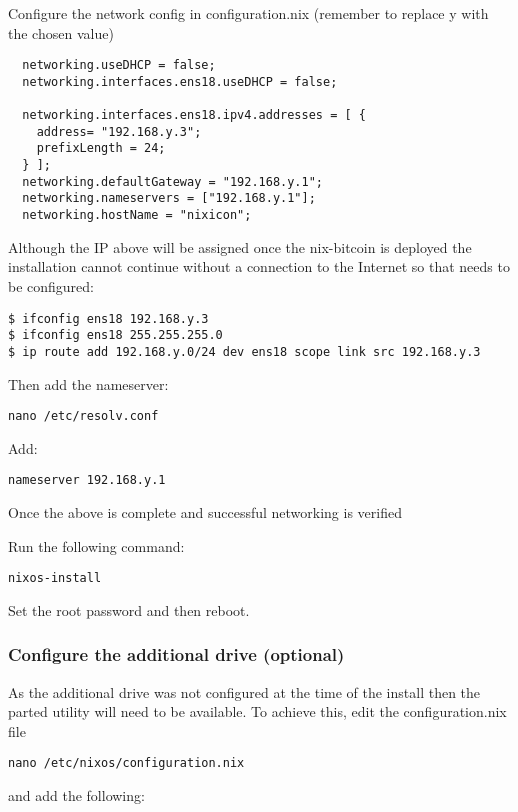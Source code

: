 Configure the network config in configuration.nix (remember to replace y
with the chosen value)

\begin{verbatim}
  networking.useDHCP = false;
  networking.interfaces.ens18.useDHCP = false;

  networking.interfaces.ens18.ipv4.addresses = [ {
    address= "192.168.y.3";
    prefixLength = 24;
  } ];
  networking.defaultGateway = "192.168.y.1";
  networking.nameservers = ["192.168.y.1"];
  networking.hostName = "nixicon";
\end{verbatim}

Although the IP above will be assigned once the nix-bitcoin is deployed
the installation cannot continue without a connection to the Internet so
that needs to be configured:

\begin{verbatim}
$ ifconfig ens18 192.168.y.3
$ ifconfig ens18 255.255.255.0
$ ip route add 192.168.y.0/24 dev ens18 scope link src 192.168.y.3
\end{verbatim}

Then add the nameserver:

\begin{verbatim}
nano /etc/resolv.conf
\end{verbatim}

Add:

\begin{verbatim}
nameserver 192.168.y.1
\end{verbatim}

Once the above is complete and successful networking is verified

Run the following command:

\texttt{nixos-install}

Set the root password and then reboot.

\hypertarget{configure-the-additional-drive-optional}{%
\subsubsection{Configure the additional drive
(optional)}\label{configure-the-additional-drive-optional}}

As the additional drive was not configured at the time of the install
then the parted utility will need to be available. To achieve this, edit
the configuration.nix file

\texttt{nano\ /etc/nixos/configuration.nix}

and add the following:

